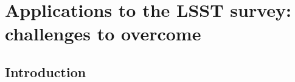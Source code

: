 
\chapter{Applications to the LSST survey: challenges to overcome}
\lhead[\fancyplain{}{\thepage}]{\fancyplain{}{\rightmark}}
 \thispagestyle{plain}
\setlength{\parindent}{10mm}


\section{Introduction}

%